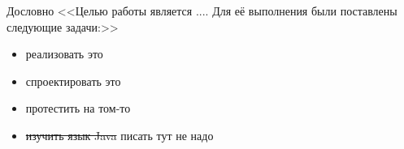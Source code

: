 Дословно <<Целью работы является .... Для её выполнения были поставлены следующие задачи:>>
 \begin{itemize}
 \item реализовать это
 \item спроектировать это
 \item протестить на том-то
 \item  \sout{изучить язык Java} писать тут не надо
 \end{itemize}
